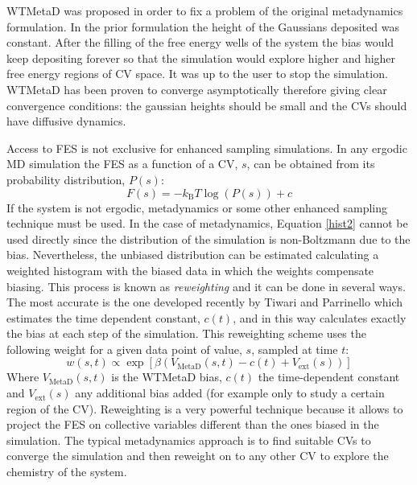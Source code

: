 WTMetaD was proposed in order to fix a problem of the original metadynamics formulation. In 
the prior formulation the height of the Gaussians deposited was constant. After the filling of 
the free energy wells of the system the bias would keep depositing forever so that the 
simulation would explore higher and higher free energy regions of CV space. It was up to the 
user to stop the simulation. WTMetaD has been proven to converge asymptotically\cite{Dama2014} 
therefore giving clear convergence conditions: the gaussian heights should be small and the CVs 
should have diffusive dynamics. 

Access to FES is not exclusive for enhanced sampling simulations. In any ergodic 
MD simulation the FES as a function of a CV, $s$, can be obtained from its 
probability distribution, $P(s)$:
\begin{equation}\label{hist2}
F(s)=-k_\text{B}T\log\left(P(s)\right)+c
\end{equation}
If the system is not ergodic, metadynamics or some other enhanced 
sampling technique must be 
used. In the case of metadynamics, Equation \ref{hist2} cannot be used directly since the 
distribution of the simulation is non-Boltzmann due to the bias. Nevertheless, the unbiased 
distribution can be estimated calculating a weighted histogram with the biased data in which the 
weights compensate biasing. This process is known as \textit{reweighting} and it can 
be done in several ways. The most accurate is the one developed recently by Tiwari and Parrinello 
which estimates the time dependent constant, $c(t)$, and in this way calculates 
exactly the bias at each step of the simulation.\cite{ReweightTiwary2015} This reweighting scheme 
uses the following 
weight for a given data point of value, $s$,  sampled at time $t$:
\begin{equation}
w(s,t)\propto\exp\left[\beta\left(V_\text{MetaD}(s,t)-c(t)+V_\text{ext}(s)\right)\right]
\end{equation}
Where $V_\text{MetaD}(s,t)$ is the WTMetaD bias, $c(t)$ the time-dependent constant and 
$V_\text{ext}(s)$ any 
additional bias added (for example only to study a certain region of the CV). Reweighting is a 
very powerful technique because it allows to project the FES on collective variables different 
than 
the ones biased in the simulation. The typical metadynamics approach is to find suitable CVs 
to converge the simulation and then reweight on to any other CV to explore the chemistry of 
the system. 

